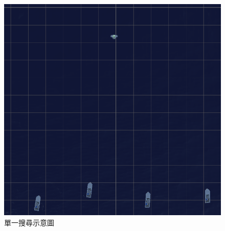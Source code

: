 \documentclass[12pt,a4paper]{article}
\begin{document}
\begin{itemize}
\begin{figure}[h]
\begin{minipage}[t]{0.4\textwidth}
	        \centering
	        \includegraphics[width=\textwidth]{image/SingleDemo.png}
	        \caption{單一搜尋示意圖}
	    \end{minipage}
	\end{figure}

\end{itemize}

\newpage
\end{document}
